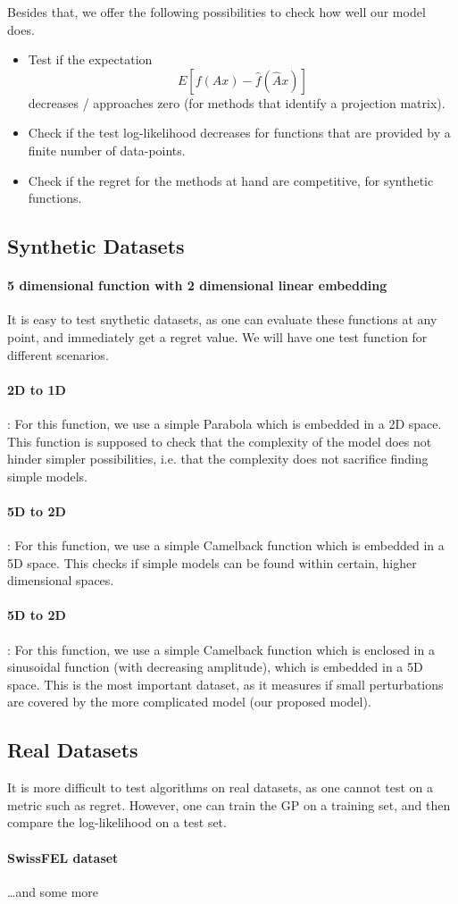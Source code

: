 Besides that, we offer the following possibilities to check how well our model does.

\begin{itemize}
\item Test if the expectation $$ E[ f(A x) - \hat{f}(\hat{A} x) ] $$ decreases / approaches zero (for methods that identify a projection matrix).
\item Check if the test log-likelihood decreases for functions that are provided by a finite number of data-points.
\item Check if the regret for the methods at hand are competitive, for synthetic functions.
\end{itemize}


\subsection{Synthetic Datasets}
\paragraph{5 dimensional function with 2 dimensional linear embedding}

It is easy to test snythetic datasets, as one can evaluate these functions at any point, and immediately get a regret value.
We will have one test function for different scenarios.

\paragraph{2D to 1D}: For this function, we use a simple Parabola which is embedded in a 2D space.
This function is supposed to check that the complexity of the model does not hinder simpler possibilities, i.e. that the complexity does not sacrifice finding simple models.
\paragraph{5D to 2D}: For this function, we use a simple Camelback function which is embedded in a 5D space.
This checks if simple models can be found within certain, higher dimensional spaces.
\paragraph{5D to 2D}: For this function, we use a simple Camelback function which is enclosed in a sinusoidal function (with decreasing amplitude), which is embedded in a 5D space.
This is the most important dataset, as it measures if small perturbations are covered by the more complicated model (our proposed model).

\subsection{Real Datasets}
It is more difficult to test algorithms on real datasets, as one cannot test on a metric such as regret.
However, one can train the GP on a training set, and then compare the log-likelihood on a test set.

\paragraph{SwissFEL dataset}
\dots and some more 


